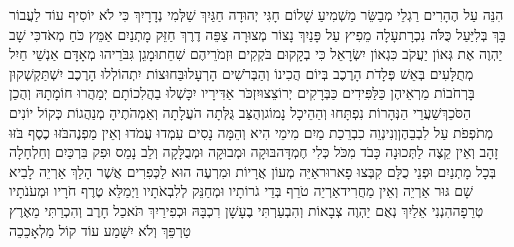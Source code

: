 \documentclass[../main/main.tex]{subfiles}
\begin{document}
\begin{multicols*}{\ncols}
הִנֵּה עַל הֶהָרִים רַגְלֵי מְבַשֵּׂר מַשְׁמִיעַ שָׁלוֹם חָגִּי יְהוּדָה חַגַּיִךְ שַׁלְּמִי נְדָרָיִךְ כִּי לֹא יוֹסִיף עוֹד לַעֲבוֹר בָּךְ בְּלִיַּעַל כֻּלֹּה נִכְרָת\PreVerseSpace{}עָלָה מֵפִיץ עַל פָּנַיִךְ נָצוֹר מְצוּרָה צַפֵּה דֶרֶךְ חַזֵּק מָתְנַיִם אַמֵּץ כֹּחַ מְאֹד\PreVerseSpace{}כִּי שָׁב יַהְוֶה אֶת גְּאוֹן יַעֲקֹב כִּגְאוֹן יִשְׂרָאֵל כִּי בְקָקוּם בֹּקְקִים וּזְמֹרֵיהֶם שִׁחֵתוּ\PreVerseSpace{}מָגֵן גִּבֹּרֵיהוּ מְאָדָּם אַנְשֵׁי חַיִל מְתֻלָּעִים בְּאֵשׁ פְּלָדֹת הָרֶכֶב בְּיוֹם הֲכִינוֹ וְהַבְּרֹשִׁים הָרְעָלוּ\PreVerseSpace{}בַּחוּצוֹת יִתְהוֹלְלוּ הָרֶכֶב יִשְׁתַּקְשְׁקוּן בָּרְחֹבוֹת מַרְאֵיהֶן כַּלַּפִּידִים כַּבְּרָקִים יְרוֹצֵצוּ\PreVerseSpace{}יִזְכֹּר אַדִּירָיו יִכָּשְׁלוּ בַהֲלִכוֹתָם יְמַהֲרוּ חוֹמָתָהּ וְהֻכַן הַסֹּכֵךְ\PreVerseSpace{}שַׁעֲרֵי הַנְּהָרוֹת נִפְתָּחוּ וְהַהֵיכָל נָמוֹג\PreVerseSpace{}וְהֻצַּב גֻּלְּתָה הֹעֲלָתָה וְאַמְהֹתֶיהָ מְנַהֲגוֹת כְּקוֹל יוֹנִים מְתֹפְפֹת עַל לִבְבֵהֶן\PreVerseSpace{}וְנִינְוֵה כִבְרֵכַת מַיִם מִימֵי הִיא וְהֵמָּה נָסִים עִמְדוּ עֲמֹדוּ וְאֵין מַפְנֶה\PreVerseSpace{}בֹּזּוּ כֶסֶף בֹּזּוּ זָהָב וְאֵין קֵצֶה לַתְּכוּנָה כָּבֹד מִכֹּל כְּלִי חֶמְדָּה\PreVerseSpace{}בּוּקָה וּמְבוּקָה וּמְבֻלָּקָה וְלֵב נָמֵס וּפִק בִּרְכַּיִם וְחַלְחָלָה בְּכָל מָתְנַיִם וּפְנֵי כֻלָּם קִבְּצוּ פָארוּר\PreVerseSpace{}אַיֵּה מְעוֹן אֲרָיוֹת וּמִרְעֶה הוּא לַכְּפִרִים אֲשֶׁר הָלַךְ אַרְיֵה לָבִיא שָׁם גּוּר אַרְיֵה וְאֵין מַחֲרִיד\PreVerseSpace{}אַרְיֵה טֹרֵף בְּדֵי גֹרוֹתָיו וּמְחַנֵּק לְלִבְאֹתָיו וַיְמַלֵּא טֶרֶף חֹרָיו וּמְעֹנֹתָיו טְרֵפָה\PreVerseSpace{}הִנְנִי אֵלַיִךְ נְאֻם יַהְוֶה צְבָאוֹת וְהִבְעַרְתִּי בֶעָשָׁן רִכְבָּהּ וּכְפִירַיִךְ תֹּאכַל חָרֶב וְהִכְרַתִּי מֵאֶרֶץ טַרְפֵּךְ וְלֹא יִשָּׁמַע עוֹד קוֹל מַלְאָכֵכֵה\OpenSection{}\par

\end{multicols*}
\end{document}
